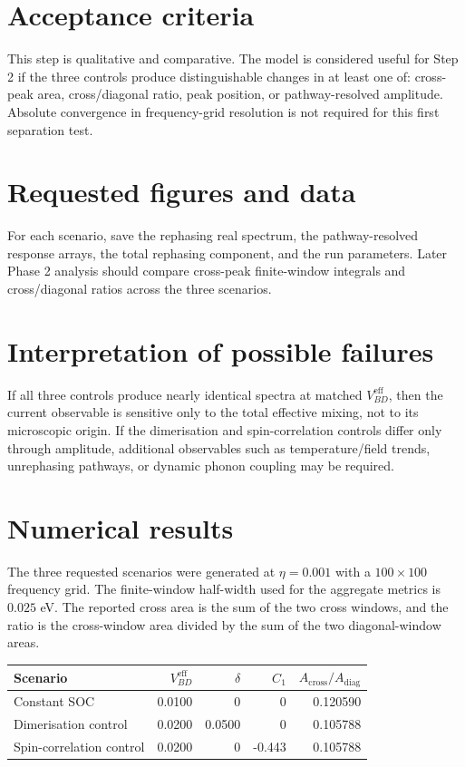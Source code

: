 \documentclass[11pt]{article}
\begin{document}
\section{Acceptance criteria}
This step is qualitative and comparative.  The model is considered useful for
Step 2 if the three controls produce distinguishable changes in at least one of:
cross-peak area, cross/diagonal ratio, peak position, or pathway-resolved
amplitude.  Absolute convergence in frequency-grid resolution is not required
for this first separation test.

\section{Requested figures and data}
For each scenario, save the rephasing real spectrum, the pathway-resolved
response arrays, the total rephasing component, and the run parameters.  Later
Phase 2 analysis should compare cross-peak finite-window integrals and
cross/diagonal ratios across the three scenarios.

\section{Interpretation of possible failures}
If all three controls produce nearly identical spectra at matched
$V_{BD}^{\mathrm{eff}}$, then the current observable is sensitive only to the
total effective mixing, not to its microscopic origin.  If the dimerisation and
spin-correlation controls differ only through amplitude, additional observables
such as temperature/field trends, unrephasing pathways, or dynamic phonon
coupling may be required.

\section{Numerical results}
The three requested scenarios were generated at $\eta=0.001$ with a
$100\times100$ frequency grid.  The finite-window half-width used for the
aggregate metrics is $0.025$ eV.  The reported cross area is the sum of the
two cross windows, and the ratio is the cross-window area divided by the sum
of the two diagonal-window areas.

\begin{center}
\begin{tabular}{lrrrr}
\toprule
Scenario & $V_{BD}^{\mathrm{eff}}$ & $\delta$ & $C_1$ &
$A_{\mathrm{cross}}/A_{\mathrm{diag}}$ \\
\midrule
Constant SOC & 0.0100 & 0 & 0 & 0.120590 \\
Dimerisation control & 0.0200 & 0.0500 & 0 & 0.105788 \\
Spin-correlation control & 0.0200 & 0 & -0.443 & 0.105788 \\
\bottomrule
\end{tabular}
\end{center}
\end{document}
